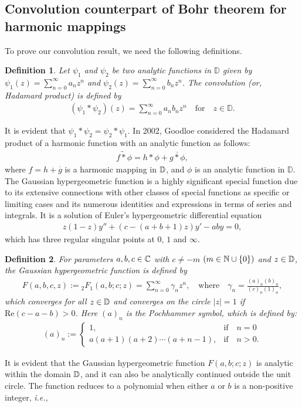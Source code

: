 \documentclass[11pt,reqno]{amsart}
\newtheorem{defi}{Definition}[section]
\newtheorem{open problem}{Open problem}[section]
\newcommand{\D}{{\Bbb{D}}}
\newcommand{\C}{{\Bbb{C}}}
\newcommand{\N}{{\Bbb{N}}}
\newcommand{\ol}{\overline}
\newcommand{\beas}{\begin{eqnarray*}}
\newcommand{\eeas}{\end{eqnarray*}}
\numberwithin{equation}{section}
\begin{document}
\subsection{Convolution counterpart of Bohr theorem for harmonic mappings}
To prove our convolution result, we need the following definitions.
\begin{defi}\cite{SS1989} Let $\psi_1$ and $\psi_2$ be two analytic functions in $\mathbb{D}$ given by $\psi_1(z)=\sum_{n=0}^{\infty}a_nz^n$ and $\psi_2(z)=\sum_{n=0}^{\infty}b_nz^n$. The convolution (or, Hadamard product) is defined by 
\beas\left(\psi_1*\psi_2\right)(z)=\sum_{n=0}^{\infty}a_nb_nz^n\quad\text{for}\quad z\in\mathbb{D}.\eeas \end{defi}
It is evident that $\psi_1*\psi_2=\psi_2*\psi_1$. In 2002, Goodloe \cite{G2002} considered the Hadamard product of a harmonic function with an analytic function as follows:
\beas f\tilde{*}\phi=h*\phi+\ol{g*\phi},\eeas
where $f=h+\ol{g}$ is a harmonic mapping in $\D$, and $\phi$ is an analytic function in $\mathbb{D}$.\\[2mm]
\indent  The Gaussian hypergeometric function is a highly significant special function due to its extensive connections with other classes of special functions as specific or limiting cases and its numerous identities and expressions in terms of series and integrals. It is a solution of Euler's hypergeometric differential equation
\beas  z(1-z)y''+\left(c-(a+b+1)z\right)y'-aby=0,\eeas 
which has three regular singular points at $0$, $1$ and $\infty$. 
\begin{defi}
For parameters $a, b, c\in\C$ with $c\not=-m$ $(m\in\N\cup\{0\})$ and $z\in\D$, the Gaussian hypergeometric function is defined by
\beas F(a, b, c, z):={}_2F_1(a,b;c;z)=\sum_{n=0}^\infty \gamma_n z^n,\quad\text{where}\quad \gamma_n=\frac{(a)_n(b)_n}{(c)_n(1)_n},\eeas
which converges for all $z\in\D$ and converges on the circle $|z|=1$ if $\text{Re}(c-a-b)>0$. Here $(a)_n$ is the Pochhammer symbol, which is defined by:
\beas
(a)_n:=\left\{\begin{array}{lll}
1,&\text{if}\quad n=0\\
a(a+1)(a+2)\cdots(a+n-1),&\text{if}\quad n>0.\end{array}\right.
\eeas
\end{defi}
It is evident that the Gaussian hypergeometric function $F(a,b;c;z)$ is analytic within the domain $\D$, and it can also be analytically continued outside the unit circle.
The function reduces to a polynomial when either $a$ or $b$ is a non-positive integer, {\it i.e.,}
\end{document}
